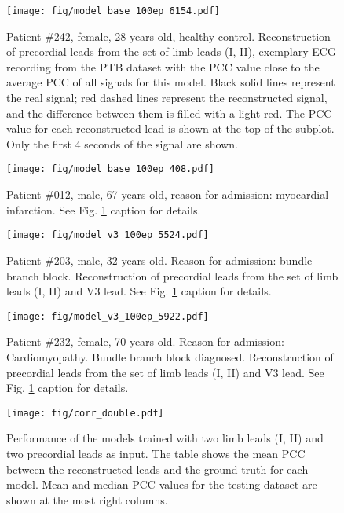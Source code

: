 \documentclass[preprint,12pt]{elsarticle}
\begin{document}
\begin{figure}[h]
    \centering
    \texttt{[image: fig/model\_base\_100ep\_6154.pdf]}
    \caption{Patient \#242, female, 28 years old, healthy control. Reconstruction of precordial leads from the set of limb leads (I, II), exemplary ECG recording from the PTB dataset with the PCC value close to the average PCC of all signals for this model. Black solid lines represent the real signal; red dashed lines represent the reconstructed signal, and the difference between them is filled with a light red. The PCC value for each reconstructed lead is shown at the top of the subplot. Only the first 4 seconds of the signal are shown.}\label{fig:base_ex1}
\end{figure}

\begin{figure}[h]
    \centering
    \texttt{[image: fig/model\_base\_100ep\_408.pdf]}
    \caption{Patient \#012, male, 67 years old, reason for admission: myocardial infarction. See Fig. \ref{fig:base_ex1} caption for details.}\label{fig:base_ex2}
\end{figure}

\begin{figure}[h]
    \centering
    \texttt{[image: fig/model\_v3\_100ep\_5524.pdf]}
    \caption{Patient \#203, male, 32 years old. Reason for admission: bundle branch block. Reconstruction of precordial leads from the set of limb leads (I, II) and V3 lead. See Fig. \ref{fig:base_ex1} caption for details.}\label{fig:v3_ex1}
\end{figure}

\begin{figure}[h]
    \centering
    \texttt{[image: fig/model\_v3\_100ep\_5922.pdf]}
    \caption{Patient \#232, female, 70 years old. Reason for admission: Cardiomyopathy. Bundle branch block diagnosed. Reconstruction of precordial leads from the set of limb leads (I, II) and V3 lead. See Fig. \ref{fig:base_ex1} caption for details.}\label{fig:v3_ex2}
\end{figure}

\begin{figure}[h]
    \centering
    \texttt{[image: fig/corr\_double.pdf]}
    \caption{Performance of the models trained with two limb leads (I, II) and two precordial leads as input. The table shows the mean PCC between the reconstructed leads and the ground truth for each model. Mean and median PCC values for the testing dataset are shown at the most right columns.}\label{fig:double}
\end{figure}
\end{document}

